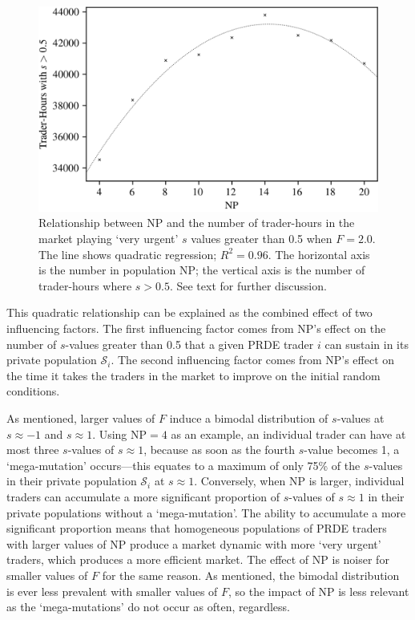 \documentclass[a4paper,twoside]{article}
\begin{document}
\begin{figure}[htbp]
    \centerline{\includegraphics[width=\columnwidth]{f=2.0_strats.png}}
    \caption{
        Relationship between $\mathrm{NP}$ and the number of trader-hours in the market playing `very urgent' $s$ values greater than 0.5 when $F=2.0$.
        The line shows quadratic regression; $R^2=0.96$.
        The horizontal axis is the number in population $\mathrm{NP}$; the vertical axis is the number of trader-hours where $s>0.5$.
        See text for further discussion.
    }
    \label{F=2.0_strats}
\end{figure}

This quadratic relationship can be explained as the combined effect of two influencing factors.
The first influencing factor comes from $\mathrm{NP}$'s effect on the number of $s$-values greater than 0.5 that a given PRDE trader $i$ can sustain in its private population $\mathcal{S}_i$.
The second influencing factor comes from $\mathrm{NP}$'s effect on the time it takes the traders in the market to improve on the initial random conditions.

As mentioned, larger values of $F$ induce a bimodal distribution of $s$-values at $s\approx -1$ and $s\approx 1$.
Using $\mathrm{NP}=\mathrm{4}$ as an example, an individual trader can have at most three $s$-values of $s\approx 1$, because as soon as the fourth $s$-value becomes 1, a `mega-mutation' occurs---this equates to a maximum of only 75\% of the $s$-values in their private population $\mathcal{S}_i$ at $s\approx 1$.
Conversely, when $\mathrm{NP}$ is larger, individual traders can accumulate a more significant proportion of $s$-values of $s\approx 1$ in their private populations without a `mega-mutation'.
The ability to accumulate a more significant proportion means that homogeneous populations of PRDE traders with larger values of $\mathrm{NP}$ produce a market dynamic with more `very urgent' traders, which produces a more efficient market.
The effect of $\mathrm{NP}$ is noiser for smaller values of $F$ for the same reason.
As mentioned, the bimodal distribution is ever less prevalent with smaller values of $F$, so the impact of $\mathrm{NP}$ is less relevant as the `mega-mutations' do not occur as often, regardless.
\end{document}
